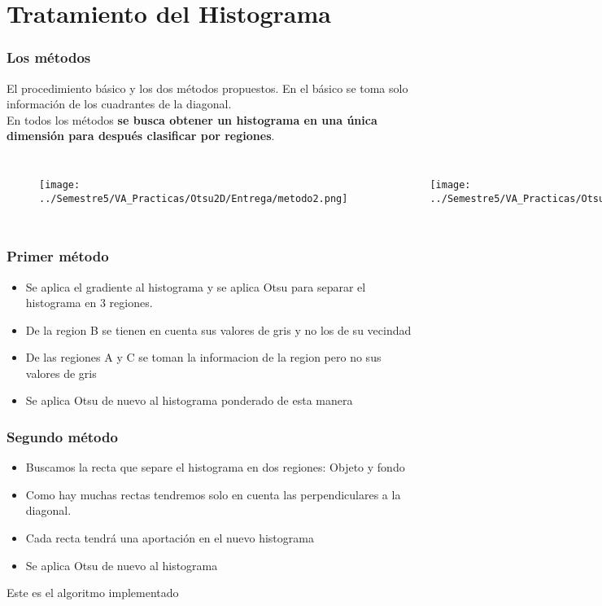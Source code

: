 \documentclass{beamer}
\begin{document}
\section{Tratamiento del Histograma}
\begin{frame}
\frametitle{Los métodos}
El procedimiento básico y los dos métodos propuestos. En el básico se toma solo información de los cuadrantes de la diagonal.\\
En todos los métodos \textbf{se busca obtener un histograma en una única dimensión para después clasificar por regiones}.
\begin{columns}[t] %
\begin{figure}
\texttt{[image: ../Semestre5/VA\_Practicas/Otsu2D/Entrega/metodo2.png]}

\end{figure}

\begin{figure}
\texttt{[image: ../Semestre5/VA\_Practicas/Otsu2D/Entrega/metodo1.png]}
\end{figure}

\end{columns}
\end{frame}

\begin{frame}
\frametitle{Primer método}
\begin{itemize}
\item Se aplica el gradiente al histograma y se aplica Otsu para separar el histograma en 3 regiones. 
\item De la region B se tienen en cuenta sus valores de gris y no los de su vecindad 
\item De las regiones A y C se toman la informacion de la region pero no sus valores de gris
\item Se aplica Otsu de nuevo al histograma ponderado de esta manera
\end{itemize}
\end{frame}

\begin{frame}
\frametitle{Segundo método}
\begin{itemize}
\item Buscamos la recta que separe el histograma en dos regiones: Objeto y fondo
\item Como hay muchas rectas tendremos solo en cuenta las perpendiculares a la diagonal.
\item Cada recta tendrá una aportación en el nuevo histograma
\item Se aplica Otsu de nuevo al histograma
\end{itemize}
Este es el algoritmo implementado
\end{frame}
\end{document}
